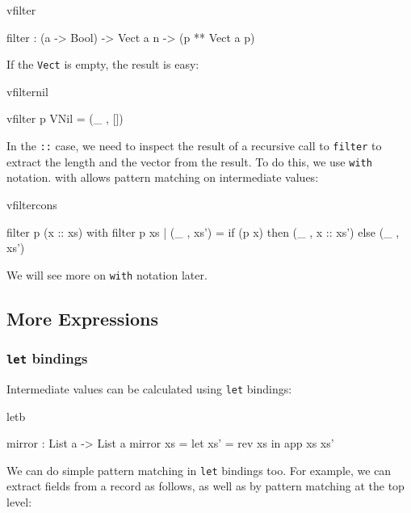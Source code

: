 \begin{SaveVerbatim}{vfilter}

filter : (a -> Bool) -> Vect a n -> (p ** Vect a p)

\end{SaveVerbatim}

\noindent
If the \texttt{Vect} is empty, the result is easy:

\begin{SaveVerbatim}{vfilternil}

vfilter p VNil = (_ , [])

\end{SaveVerbatim}

\noindent
In the \texttt{::} case, we need to inspect the result of a recursive call to 
\texttt{filter} to
extract the length and the vector from the result. To do this, we use \texttt{with}
notation. with allows pattern matching on intermediate values:

\begin{SaveVerbatim}{vfiltercons}

filter p (x :: xs) with filter p xs {
   | (_ , xs') = if (p x) then (_ , x :: xs') else (_ , xs')
}

\end{SaveVerbatim}

\noindent
We will see more on \texttt{with} notation later.

\subsection{More Expressions}

\subsubsection*{\texttt{let} bindings}

Intermediate values can be calculated using \texttt{let} bindings:

\begin{SaveVerbatim}{letb}

mirror : List a -> List a
mirror xs = let xs' = rev xs in
                app xs xs'

\end{SaveVerbatim}

\noindent
We can do simple pattern matching in \texttt{let} bindings too. For example, we can extract
fields from a record as follows, as well as by pattern matching at the top level:


